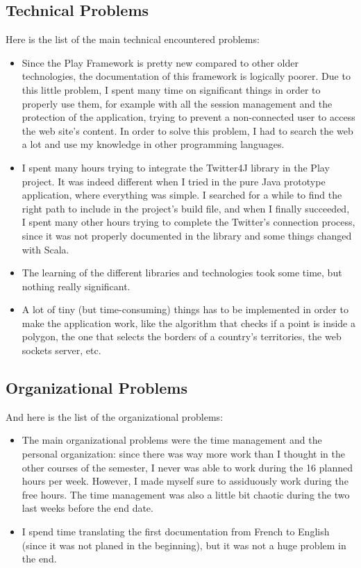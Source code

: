\documentclass[a4paper,11pt]{report}
\begin{document}
\subsection{Technical Problems}
Here is the list of the main technical encountered problems:
\begin{itemize}
	\item Since the Play Framework is pretty new compared to other older technologies, the documentation of this framework is logically poorer. Due to this little problem, I spent many time on significant things in order to properly use them, for example with all the session management and the protection of the application, trying to prevent a non-connected user to access the web site's content.
	In order to solve this problem, I had to search the web a lot and use my knowledge in other programming languages.
	\item I spent many hours trying to integrate the Twitter4J library in the Play project. It was indeed different when I tried in the pure Java prototype application, where everything was simple. I searched for a while to find the right path to include in the project's build file, and when I finally succeeded, I spent many other hours trying to complete the Twitter's connection process, since it was not properly documented in the library and some things changed with Scala.
	\item The learning of the different libraries and technologies took some time, but nothing really significant.
	\item A lot of tiny (but time-consuming) things has to be implemented in order to make the application work, like the algorithm that checks if a point is inside a polygon, the one that selects the borders of a country's territories, the web sockets server, etc.
\end{itemize}

\subsection{Organizational Problems}
And here is the list of the organizational problems:
\begin{itemize}
	\item The main organizational problems were the time management and the personal organization: since there was way more work than I thought in the other courses of the semester, I never was able to work during the 16 planned hours per week. However, I made myself sure to assiduously work during the free hours. The time management was also a little bit chaotic during the two last weeks before the end date.
	\item I spend time translating the first documentation from French to English (since it was not planed in the beginning), but it was not a huge problem in the end.
\end{itemize}
\newpage	
\end{document}
